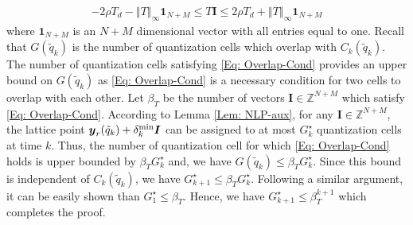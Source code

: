 \documentclass[10pt,twocolumn,twoside]{IEEEtran}
\begin{document}
\begin{IEEEproof}
{\begin{align}\label{Eq: Overlap-Cond}
-2\rho T_d-{\left\Vert{T}\right\Vert_{{\infty}}}{\ensuremath{\mathbf{1}}}_{N+M}\leq T{\ensuremath{\boldsymbol{{I}}}}\leq2\rho T_d+{\left\Vert{T}\right\Vert_{{\infty}}}{\ensuremath{\mathbf{1}}}_{N+M}
\end{align}
 where ${\ensuremath{\mathbf{1}}}_{N+M}$ is an $N+M$ dimensional vector with all entries equal to one. Recall that $G{\left({\tilde{q}_k}\right)}$ is the number of quantization cells which overlap with $C_k{\left({\tilde{q}_k}\right)}$. The number of quantization cells satisfying \eqref{Eq: Overlap-Cond}  provides an upper bound on $G{\left({\tilde{q}_k}\right)}$ as  \eqref{Eq: Overlap-Cond} is a necessary condition for two cells to overlap with each other. Let $\beta_T$ be the number of vectors ${\ensuremath{\boldsymbol{{I}}}}\in{\ensuremath{{\ensuremath{\mathbb{{Z}}}}}}^{N+M}$ which satisfy \eqref{Eq: Overlap-Cond}. According to Lemma \ref{Lem: NLP-aux},  for any ${\ensuremath{\boldsymbol{{I}}}}\in{\ensuremath{{\ensuremath{\mathbb{{Z}}}}}}^{N+M}$,  the lattice point ${\ensuremath{\boldsymbol{{y}}}}_r{\left({\tilde{q}_k}\right)}+\delta^{\rm min}_k{\ensuremath{\boldsymbol{{I}}}}$ can be assigned to at most $G^\star_k$  quantization cells at time $k$. Thus, the number of quantization cell for which \eqref{Eq: Overlap-Cond} holds is upper bounded by $\beta_T G^\star_k$ and, we have $G{\left({\tilde{q}_k}\right)}\leq \beta_T G^\star_k$. 
		Since this bound is independent of $C_k{\left({\tilde{q}_k}\right)}$, we have $G^\star_{k+1}\leq \beta_T G^\star_k$. Following a similar argument, it can be easily shown than $G^\star_1\leq \beta_T$. Hence, we have $G^\star_{k+1}\leq \beta_T^{k+1}$ which completes the proof. 
}
\end{IEEEproof}
\end{document}
